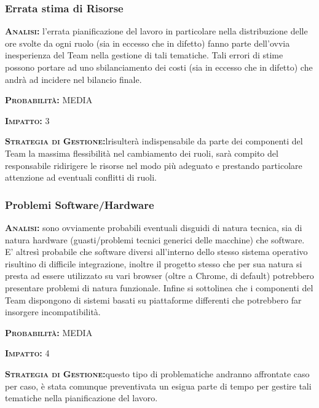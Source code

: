 \subsubsection{Errata stima di Risorse}
\begin{description}
	\item{\scshape\bfseries Analisi:} l'errata pianificazione del lavoro in particolare nella distribuzione delle ore svolte da ogni ruolo (sia in eccesso che in difetto) fanno parte dell'ovvia inesperienza del Team nella gestione di tali tematiche. Tali errori di stime possono portare ad uno sbilanciamento dei costi (sia in eccesso che in difetto) che andrà ad incidere nel bilancio finale.
	\item{\scshape\bfseries Probabilità:} MEDIA
	\item{\scshape\bfseries Impatto:} 3
	\item{\scshape\bfseries Strategia di Gestione:}lrisulterà indispensabile da parte dei componenti del Team la massima flessibilità nel cambiamento dei ruoli, sarà compito del responsabile ridirigere le risorse nel modo più adeguato e prestando particolare attenzione ad eventuali conflitti di ruoli.
\end{description}

\subsubsection{Problemi Software/Hardware}
\begin{description}
	\item{\scshape\bfseries Analisi:} sono ovviamente probabili eventuali disguidi di natura tecnica, sia di natura hardware (guasti/problemi tecnici generici delle macchine) che software. E' altresì probabile che software diversi all'interno dello stesso sistema operativo risultino di difficile integrazione, inoltre il progetto stesso che per sua natura si presta ad essere utilizzato su vari browser (oltre a Chrome, di default) potrebbero presentare problemi di natura funzionale. Infine si sottolinea che i componenti del Team dispongono di sistemi basati su piattaforme differenti che potrebbero far insorgere incompatibilità.
	\item{\scshape\bfseries Probabilità:} MEDIA
	\item{\scshape\bfseries Impatto:} 4
	\item{\scshape\bfseries Strategia di Gestione:}questo tipo di problematiche andranno affrontate caso per caso, è stata comunque preventivata un esigua parte di tempo per gestire tali tematiche nella pianificazione del lavoro.
\end{description}




